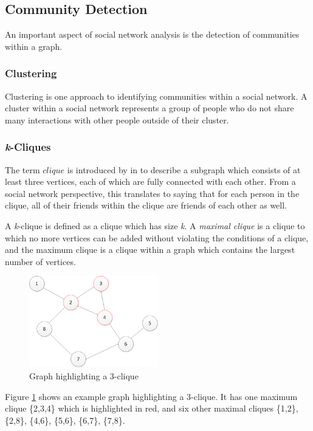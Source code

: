 \subsection{Community Detection}
An important aspect of social network analysis is the detection of communities within a graph.

\subsubsection{Clustering}
Clustering is one approach to identifying communities within a social network. A cluster within a social network represents a group of people who do not share many interactions with other people outside of their cluster.

\subsubsection{\emph{k}-Cliques}
The term $clique$ is introduced by \citeauthor{luce49} in \cite{luce49} to describe a subgraph which consists of at least three vertices, each of which are fully connected with each other. From a social network perspective, this translates to saying that for each person in the clique, all of their friends  within the clique are friends of each other as well.

A \emph{k}-clique is defined as a clique which has size \emph{k}. A \emph{maximal clique} is a clique to which no more vertices can be added without violating the conditions of a clique, and the maximum clique is a clique within a graph which contains the largest number of vertices.

\begin{figure}[htbp]
\centering
\includegraphics[width=0.5\textwidth]{./img/clique.png}
\caption{Graph highlighting a 3-clique}
\label{fig:clique}
\end{figure}

Figure \ref{fig:clique} shows an example graph highlighting a 3-clique. It has one maximum clique \{2,3,4\} which is highlighted in red, and six other maximal cliques \{1,2\}, \{2,8\}, \{4,6\}, \{5,6\}, \{6,7\}, \{7,8\}.

